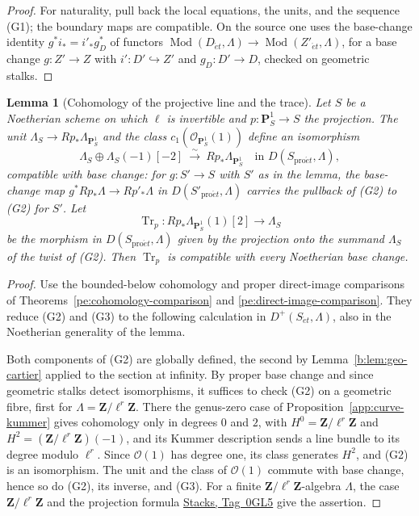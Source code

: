\documentclass[11pt,a4paper]{article}
\numberwithin{equation}{section}
\newtheorem{lemma}[theorem]{Lemma}
\theoremstyle{definition}
\theoremstyle{remark}
\newcommand{\Mod}{\operatorname{Mod}}
\newcommand{\et}{\acute{e}t}
\newcommand{\proet}{\mathrm{pro}\acute{e}t}
\newcommand{\stacks}[1]{\href{https://stacks.math.columbia.edu/tag/#1}{\textnormal{Stacks, Tag~#1}}}
\begin{document}
\begin{proof}
For naturality, pull back the local equations, the units, and the
sequence (G1); the boundary maps are compatible. On the source one uses
the base-change identity \(g^*i_*=i'_*g_D^*\) of functors
\(\Mod(D_{\et},\Lambda)\to\Mod(Z'_{\et},\Lambda)\), for a base change
\(g:Z'\to Z\) with \(i':D'\hookrightarrow Z'\) and \(g_D:D'\to D\),
checked on geometric stalks.
\end{proof}

\begin{lemma}[Cohomology of the projective line and the trace]
\label{b:lem:geo-p1-cohomology}
Let \(S\) be a Noetherian scheme on which \(\ell\) is invertible and
\(p:\mathbf P^1_S\to S\) the projection. The unit
\(\Lambda_S\to Rp_*\Lambda_{\mathbf P^1_S}\) and the class
\(c_1(\mathcal O_{\mathbf P^1_S}(1))\) define an isomorphism
\[
 \Lambda_S\oplus\Lambda_S(-1)[-2]
       \ \xrightarrow{\ \sim\ }\ Rp_*\Lambda_{\mathbf P^1_S}
       \quad\text{in }D(S_{\proet},\Lambda),   \tag{G2}
\]
compatible with base change: for \(g:S'\to S\) with \(S'\) as in the
lemma, the base-change map \(g^*Rp_*\Lambda\to Rp'_*\Lambda\) in
\(D(S'_{\proet},\Lambda)\) carries the pullback of (G2) to (G2) for
\(S'\). Let
\[
 \operatorname{Tr}_p:Rp_*\Lambda_{\mathbf P^1_S}(1)[2]\longrightarrow\Lambda_S
                                                               \tag{G3}
\]
be the morphism in \(D(S_{\proet},\Lambda)\) given by the projection
onto the summand \(\Lambda_S\) of the twist of (G2).
Then \(\operatorname{Tr}_p\) is compatible with every Noetherian base
change.
\end{lemma}

\begin{proof}
Use the bounded-below cohomology and proper direct-image comparisons
of Theorems~\ref{pe:cohomology-comparison} and
\ref{pe:direct-image-comparison}. They reduce (G2) and (G3) to the
following calculation in \(D^+(S_{\et},\Lambda)\), also in the
Noetherian generality of the lemma.

Both components of (G2) are globally defined, the second by
Lemma~\ref{b:lem:geo-cartier} applied to the section at infinity. By
proper base change and since geometric stalks detect isomorphisms, it
suffices to check (G2) on a geometric fibre, first for
\(\Lambda=\mathbf Z/\ell^r\mathbf Z\). There the genus-zero case of
Proposition~\ref{app:curve-kummer} gives cohomology only in degrees
\(0\) and \(2\), with \(H^0=\mathbf Z/\ell^r\mathbf Z\) and
\(H^2=(\mathbf Z/\ell^r\mathbf Z)(-1)\), and its Kummer description sends
a line bundle to its degree modulo \(\ell^r\). Since
\(\mathcal O(1)\) has degree one, its class generates \(H^2\), and (G2)
is an isomorphism. The unit and the class of \(\mathcal O(1)\) commute
with base change, hence so do (G2), its inverse, and (G3). For a finite
\(\mathbf Z/\ell^r\mathbf Z\)-algebra \(\Lambda\), the case
\(\mathbf Z/\ell^r\mathbf Z\) and the projection formula \stacks{0GL5}
give the assertion.
\end{proof}
\end{document}

